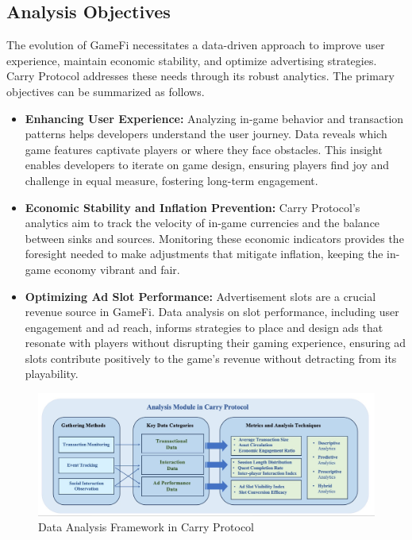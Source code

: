 \subsection{Analysis Objectives}
The evolution of GameFi necessitates a data-driven approach to improve user experience, maintain economic stability, and optimize advertising strategies. Carry Protocol addresses these needs through its robust analytics. The primary objectives can be summarized as follows.
\begin{itemize}
    \item \textbf{Enhancing User Experience:} Analyzing in-game behavior and transaction patterns helps developers understand the user journey. Data reveals which game features captivate players or where they face obstacles. This insight enables developers to iterate on game design, ensuring players find joy and challenge in equal measure, fostering long-term engagement.
\item \textbf{Economic Stability and Inflation Prevention:} Carry Protocol's analytics aim to track the velocity of in-game currencies and the balance between sinks and sources. Monitoring these economic indicators provides the foresight needed to make adjustments that mitigate inflation, keeping the in-game economy vibrant and fair.

\item \textbf{Optimizing Ad Slot Performance:} Advertisement slots are a crucial revenue source in GameFi. Data analysis on slot performance, including user engagement and ad reach, informs strategies to place and design ads that resonate with players without disrupting their gaming experience, ensuring ad slots contribute positively to the game's revenue without detracting from its playability.
\end{itemize}



\begin{figure}[!htb]
    \centering
    \includegraphics[width=1.0\textwidth]{data analysis.jpg}
    \caption{Data Analysis Framework in Carry Protocol}
    \label{fig:analysis}
\end{figure}



